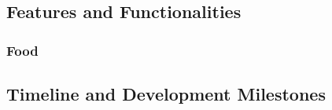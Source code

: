 \documentclass[11pt]{article}
\begin{document}
\subsection{Features and Functionalities}
\subsubsection{Food}


\subsection{Timeline and Development Milestones}
\end{document}

